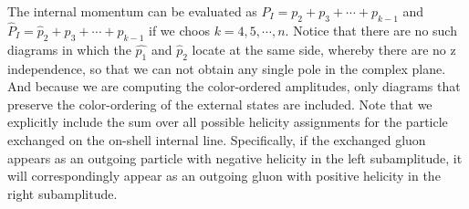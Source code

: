 \documentclass[12pt]{article}
\numberwithin{equation}{section}
\begin{document}
The internal momentum can be evaluated as $P_I=p_2+p_3+\cdots+p_{k-1}$ and $\hat{P}_I=\hat{p}_2+p_3+\cdots +p_{k-1}$ if we choos $k=4,5,\cdots,n$. Notice that there are no such diagrams in which the $\hat{p_1}$ and $\hat{p}_2$ locate at the same side, whereby there are no z independence, so that we can not obtain any single pole in the complex plane. And because we are computing the color-ordered amplitudes, only diagrams that preserve the color-ordering of the external states are included. Note that we explicitly include the sum over all possible helicity assignments for the particle exchanged on the on-shell internal line. Specifically, if the exchanged gluon appears as an outgoing particle with negative helicity in the left subamplitude, it will correspondingly appear as an outgoing gluon with positive helicity in the right subamplitude.
\end{document}
